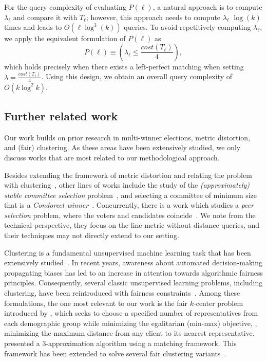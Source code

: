 \documentclass{article}
\begin{document}
For the query complexity of evaluating $P(\ell)$, a natural approach is to compute  $\lambda_{\ell}$ and compare it with $T_{\ell}$; however, this approach needs to compute $\lambda_{\ell}$ $\log(k)$ times and leads to  $O(\ell \log^3(k))$ queries. To avoid repetitively computing $\lambda_{\ell}$, we apply the equivalent formulation of $P(\ell)$ as 
$$P(\ell)\equiv (\lambda_{\ell} \leq \frac{cost(T_{\ell})}{4}),$$
which holds precisely when there exists a left-perfect matching when setting $\lambda = \frac{cost(T_{\ell})}{4}$. Using this design, we obtain an overall query complexity of $O(k \log^2 k)$. 










\subsection{Further related work}
Our work builds on prior research in multi-winner elections, metric distortion, and (fair) clustering. As these areas have been extensively studied, we only discuss works that are most related to our 
methodological approach.


Besides extending the framework of metric distortion and relating the problem with clustering~\cite{burkhardt2024low, pulyassary2025constant, caragiannis2022metric}, 
other lines of works include the study of the \emph{(approximately) stable committee selection} problem~\cite{fain2018fair,jiang2020approximately}, and selecting a committee of minimum size that is a \emph{Condorcet winner}~\cite{charikar2025six}.
Concurrently, there is a work which studies a \emph{peer selection} problem, where the voters and candidates coincide~\cite{cembrano2025metric}. We note from the technical perspective, they focus on the line metric without distance queries, and their techniques may not directly extend to our setting.


Clustering is a fundamental unsupervised machine learning task that has been extensively studied~\cite{jain1999data}. In recent years, awareness about automated decision-making propagating biases has led to an increase in attention towards algorithmic fairness principles. Consequently, several classic unsupervised learning problems, including clustering, have been reintroduced with fairness constraints~\cite{thejaswi2021diversity, thejaswi2022clustering,thejaswi2024diversity,gadekar2025capacitated,matakos2024fair,zhang2024parameterized,abbasi2023parameterized,gadekar2025fair,chierichetti2017fair}. Among these formulations, the one most relevant to our work is the fair $k$-center problem introduced by \citet{kleindessner2019fair}, which seeks to choose a specified number of representatives from each demographic group while minimizing the egalitarian (min-max) objective, \ie, minimizing the maximum distance from any client to its nearest representative. \citet{jones2020fair} presented a $3$-approximation algorithm using a matching framework. This framework has been extended to solve several fair clustering variants~\cite{gadekar2025fair,chen2024approximation}.
\end{document}
